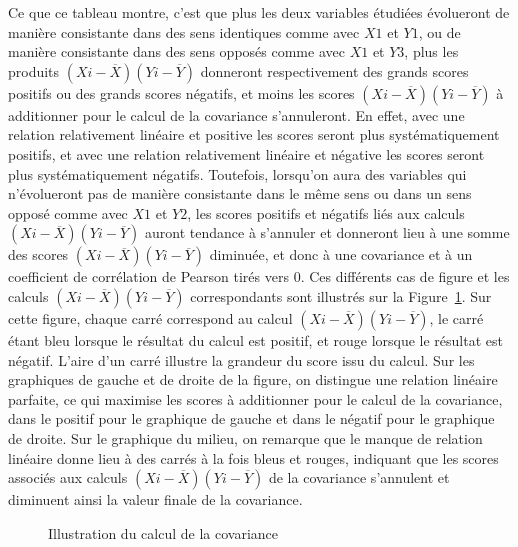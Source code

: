 \documentclass[
  letterpaper,
]{book}
\begin{document}
Ce que ce tableau montre, c'est que plus les deux variables étudiées
évolueront de manière consistante dans des sens identiques comme avec
\(X1\) et \(Y1\), ou de manière consistante dans des sens opposés comme
avec \(X1\) et \(Y3\), plus les produits
\((X{i} - \overline{X}) (Y{i} - \overline{Y})\) donneront respectivement
des grands scores positifs ou des grands scores négatifs, et moins les
scores \((X{i} - \overline{X}) (Y{i} - \overline{Y})\) à additionner
pour le calcul de la covariance s'annuleront. En effet, avec une
relation relativement linéaire et positive les scores seront plus
systématiquement positifs, et avec une relation relativement linéaire et
négative les scores seront plus systématiquement négatifs. Toutefois,
lorsqu'on aura des variables qui n'évolueront pas de manière consistante
dans le même sens ou dans un sens opposé comme avec \(X1\) et \(Y2\),
les scores positifs et négatifs liés aux calculs
\((X{i} - \overline{X}) (Y{i} - \overline{Y})\) auront tendance à
s'annuler et donneront lieu à une somme des scores
\((X{i} - \overline{X}) (Y{i} - \overline{Y})\) diminuée, et donc à une
covariance et à un coefficient de corrélation de Pearson tirés vers 0.
Ces différents cas de figure et les calculs
\((X{i} - \overline{X}) (Y{i} - \overline{Y})\) correspondants sont
illustrés sur la Figure~\ref{fig-graphCov}. Sur cette figure, chaque
carré correspond au calcul
\((X{i} - \overline{X}) (Y{i} - \overline{Y})\), le carré étant bleu
lorsque le résultat du calcul est positif, et rouge lorsque le résultat
est négatif. L'aire d'un carré illustre la grandeur du score issu du
calcul. Sur les graphiques de gauche et de droite de la figure, on
distingue une relation linéaire parfaite, ce qui maximise les scores à
additionner pour le calcul de la covariance, dans le positif pour le
graphique de gauche et dans le négatif pour le graphique de droite. Sur
le graphique du milieu, on remarque que le manque de relation linéaire
donne lieu à des carrés à la fois bleus et rouges, indiquant que les
scores associés aux calculs
\((X{i} - \overline{X}) (Y{i} - \overline{Y})\) de la covariance
s'annulent et diminuent ainsi la valeur finale de la covariance.

\begin{figure}


\caption{\label{fig-graphCov}Illustration du calcul de la covariance}

\end{figure}%
\end{document}
